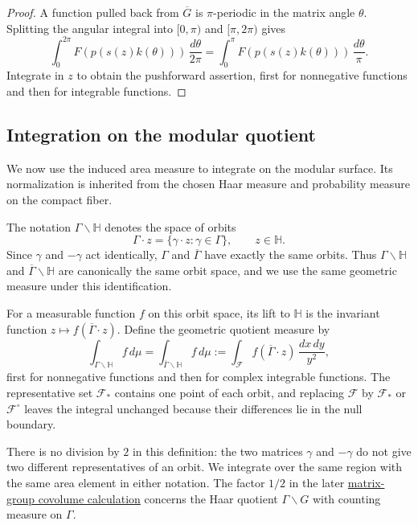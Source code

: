 \begin{proof}
A function pulled back from $\overline G$ is $\pi$-periodic in the matrix angle $\theta$. Splitting the angular integral into $[0,\pi)$ and $[\pi,2\pi)$ gives
\[
 \int_0^{2\pi}F(p(s(z)k(\theta)))\,\frac{d\theta}{2\pi}
 =\int_0^\pi F(p(s(z)k(\theta)))\,\frac{d\theta}{\pi}.
\]
Integrate in $z$ to obtain the pushforward assertion, first for nonnegative functions and then for integrable functions.
\end{proof}

\subsection*{Integration on the modular quotient}\label{modular.quotient-integration}

We now use the induced area measure to integrate on the modular surface. Its normalization is inherited from the chosen Haar measure and probability measure on the compact fiber.

\begin{definition}\label{modular.quotient-measure}
The notation $\Gamma\backslash\mathbb H$ denotes the space of orbits
\[
 \Gamma\cdot z=\{\gamma\cdot z:\gamma\in\Gamma\},\qquad z\in\mathbb H.
\]
Since $\gamma$ and $-\gamma$ act identically, $\Gamma$ and $\overline\Gamma$ have exactly the same orbits. Thus $\Gamma\backslash\mathbb H$ and $\overline\Gamma\backslash\mathbb H$ are canonically the same orbit space, and we use the same geometric measure under this identification.

For a measurable function $f$ on this orbit space, its lift to $\mathbb H$ is the invariant function $z\mapsto f(\overline\Gamma\cdot z)$. Define the geometric quotient measure by
\[
 \int_{\Gamma\backslash\mathbb H} f\,d\mu
 =\int_{\overline\Gamma\backslash\mathbb H} f\,d\mu
 :=\int_{\mathcal F} f(\overline\Gamma\cdot z)\,\frac{dx\,dy}{y^2},
\]
first for nonnegative functions and then for complex integrable functions. The representative set $\mathcal F_*$ contains one point of each orbit, and replacing $\mathcal F$ by $\mathcal F_*$ or $\mathcal F^\circ$ leaves the integral unchanged because their differences lie in the null boundary.

There is no division by $2$ in this definition: the two matrices $\gamma$ and $-\gamma$ do not give two different representatives of an orbit. We integrate over the same region with the same area element in either notation. The factor $1/2$ in the later \hyperref[modular.central-covolumes]{matrix-group covolume calculation} concerns the Haar quotient $\Gamma\backslash G$ with counting measure on $\Gamma$.
\end{definition}


